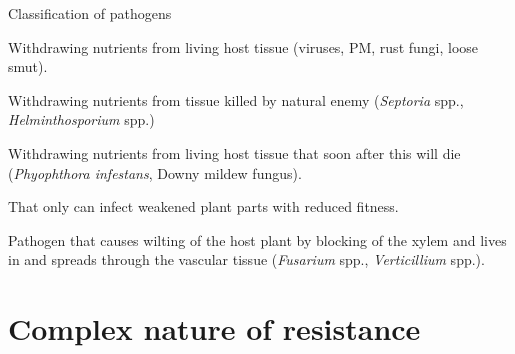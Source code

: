 \documentclass[11pt,dvipsnames,ignorenonframetext,aspectratio=169]{beamer}
\begin{document}
\begin{frame}{Classification of pathogens}
\protect\hypertarget{classification-of-pathogens}{}
\begin{description}
\small
\item[Biotrophs] Withdrawing nutrients from living host tissue (viruses, PM, rust fungi, loose smut).
\item[Necrotrophs] Withdrawing nutrients from tissue killed by natural enemy (\textit{Septoria} spp., \textit{Helminthosporium} spp.)
\item[Hemi-biotrophs] Withdrawing nutrients from living host tissue that soon after this will die (\textit{Phyophthora infestans}, Downy mildew fungus).
\item[Weakness pathogen] That only can infect weakened plant parts with reduced fitness.
\item[Vascular wilts] Pathogen that causes wilting of the host plant by blocking of the xylem and lives in and spreads through the vascular tissue (\textit{Fusarium} spp., \textit{Verticillium} spp.).
\end{description}
\end{frame}

\hypertarget{complex-nature-of-resistance}{%
\section{Complex nature of
resistance}\label{complex-nature-of-resistance}}
\end{document}
